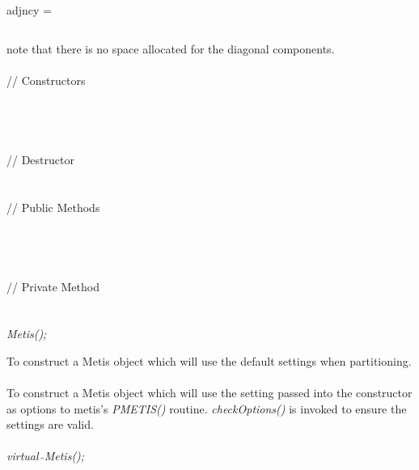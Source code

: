 adjncy =

$$

$$


\noindent note that there is no space allocated for the diagonal
components. \\

  \\
\indent\indent // Constructors  \\
\indent{}  \\ \\
\indent{}  \\ \\
\indent\indent // Destructor  \\
\indent{}  \\ \\
\indent\indent // Public Methods  \\
\indent{} \\
\indent{}\\
\indent{}  \\ \\
\indent\indent // Private Method  \\
\indent{} \\


  \\
{\em Metis();}  

To construct a Metis object which will use the default settings when
partitioning. \\ 

  \\
To construct a Metis object which will use the setting passed into the
constructor as options to metis's {\em PMETIS()} routine. {\em
checkOptions()} is invoked to ensure the settings are valid. \\

  \\
{\em virtual~$\tilde{}$Metis();}  


